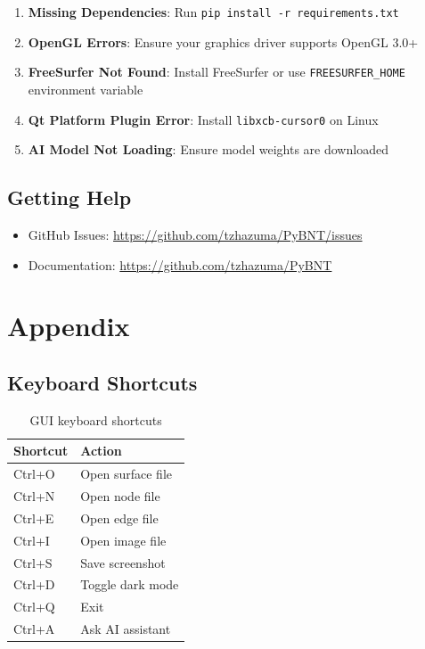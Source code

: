 \documentclass[11pt,a4paper]{article}
\begin{document}
\begin{enumerate}
    \item \textbf{Missing Dependencies}: Run \texttt{pip install -r requirements.txt}
    \item \textbf{OpenGL Errors}: Ensure your graphics driver supports OpenGL 3.0+
    \item \textbf{FreeSurfer Not Found}: Install FreeSurfer or use \texttt{FREESURFER\_HOME} environment variable
    \item \textbf{Qt Platform Plugin Error}: Install \texttt{libxcb-cursor0} on Linux
    \item \textbf{AI Model Not Loading}: Ensure model weights are downloaded
\end{enumerate}

\subsection{Getting Help}

\begin{itemize}
    \item GitHub Issues: \url{https://github.com/tzhazuma/PyBNT/issues}
    \item Documentation: \url{https://github.com/tzhazuma/PyBNT}
\end{itemize}

\section{Appendix}

\subsection{Keyboard Shortcuts}

\begin{table}[H]
\centering
\begin{tabular}{ll}
\toprule
\textbf{Shortcut} & \textbf{Action} \\
\midrule
Ctrl+O & Open surface file \\
Ctrl+N & Open node file \\
Ctrl+E & Open edge file \\
Ctrl+I & Open image file \\
Ctrl+S & Save screenshot \\
Ctrl+D & Toggle dark mode \\
Ctrl+Q & Exit \\
Ctrl+A & Ask AI assistant \\
\bottomrule
\end{tabular}
\caption{GUI keyboard shortcuts}
\end{table}
\end{document}
